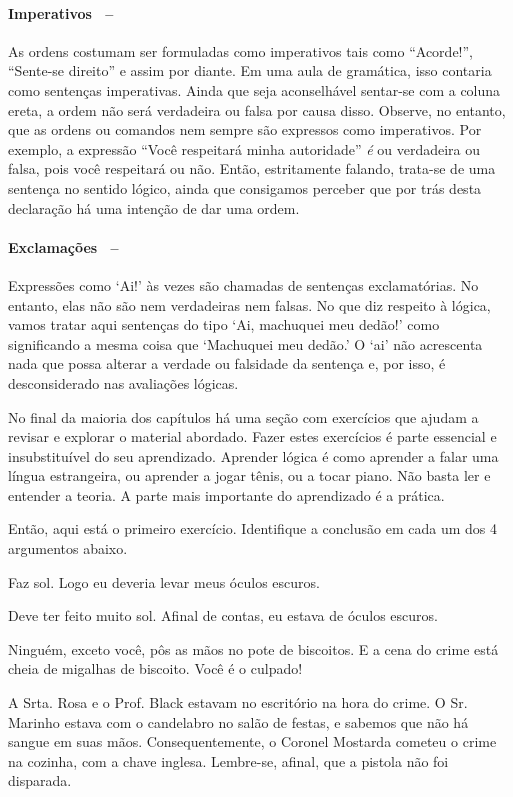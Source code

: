 \paragraph{Imperativos \ --}As ordens costumam ser formuladas como imperativos tais como ``Acorde!'', ``Sente-se direito'' e assim por diante.
Em uma aula de gramática, isso contaria como sentenças imperativas.
Ainda que seja aconselhável sentar-se com a coluna ereta, a ordem não será verdadeira ou falsa por causa disso.
Observe, no entanto, que as ordens ou comandos nem sempre são expressos como imperativos.
Por exemplo, a expressão ``Você respeitará minha autoridade'' \emph{é} ou verdadeira ou falsa, pois você respeitará ou não.
Então, estritamente falando, trata-se de uma sentença no sentido lógico, ainda que consigamos perceber que por trás desta declaração há uma intenção de dar uma ordem.

\paragraph{Exclamações \ --}Expressões como `Ai!' às vezes são chamadas de sentenças exclamatórias.
No entanto, elas não são nem verdadeiras nem falsas.
No que diz respeito à lógica, vamos tratar aqui sentenças do tipo `Ai, machuquei meu dedão!' como significando a mesma coisa que `Machuquei meu dedão.'
O `ai' não acrescenta nada que possa alterar a verdade ou falsidade da sentença e, por isso, é desconsiderado nas avaliações lógicas.


\practiceproblems
No final da maioria dos capítulos há uma seção com exercícios que ajudam a revisar e explorar o material abordado.
Fazer estes exercícios é parte essencial e insubstituível do seu aprendizado.
Aprender lógica é como aprender a falar uma língua estrangeira, ou aprender a jogar tênis, ou a tocar piano.
Não basta ler e entender a teoria.
A parte mais importante do aprendizado é a prática.

\medskip


Então, aqui está o primeiro exercício. Identifique a conclusão em cada um dos 4 argumentos abaixo.
\begin{earg}
	\item Faz sol. Logo eu deveria levar meus óculos escuros.
	\item Deve ter feito muito sol. Afinal de contas, eu estava de óculos escuros.
	\item Ninguém, exceto você, pôs as mãos no pote de biscoitos.
	E a cena do crime está cheia de migalhas de biscoito.
	Você é o culpado!
	\item A Srta. Rosa e o Prof. Black estavam no escritório na hora do crime.
	O Sr. Marinho estava com o candelabro no salão de festas,
	e sabemos que não há sangue em suas mãos.
	Consequentemente, o Coronel Mostarda cometeu o crime na cozinha, com a chave inglesa.
	Lembre-se, afinal, que a pistola não foi disparada.
\end{earg}



